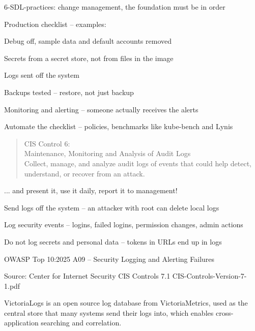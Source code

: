 \documentclass[Screen16to9,17pt]{foils}
\begin{document}
\begin{list2}
\item 6-SDL-practices: change management, the foundation must be in order
\item Production checklist -- examples:
\begin{list2}
\item Debug off, sample data and default accounts removed
\item Secrets from a secret store, not from files in the image
\item Logs sent off the system
\item Backups tested -- restore, not just backup
\item Monitoring and alerting -- someone actually receives the alerts
\end{list2}
\item Automate the checklist -- policies, benchmarks like kube-bench and Lynis
\end{list2}



\begin{quote}
CIS Control 6:\\
Maintenance, Monitoring and Analysis of Audit Logs\\
Collect, manage, and analyze audit logs of events that could help detect, understand, or recover from an attack.
\end{quote}

\begin{list1}
\item ... and present it, use it daily, report it to management!
\item Send logs off the system -- an attacker with root can delete local logs
\item Log security events -- logins, failed logins, permission changes, admin actions
\item Do not log secrets and personal data -- tokens in URLs end up in logs
\item OWASP Top 10:2025 A09 -- Security Logging and Alerting Failures
\end{list1}

Source: Center for Internet Security CIS Controls 7.1 CIS-Controls-Version-7-1.pdf




VictoriaLogs is an open source log database from VictoriaMetrics, used as the central store that many systems send their logs into, which enables cross-application searching and correlation.
\end{document}
